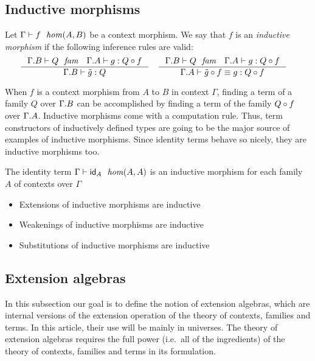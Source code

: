 \subsection{Inductive morphisms}
\begin{defn}
Let $\jhom{\Gamma}{A}{B}{f}$ be a context morphism. We say that $f$ is an 
\emph{inductive morphism} if the following inference rules are valid:
\begin{align*}
& \inference
  { \jfam{{\Gamma}{B}}{Q}
    \jterm{{\Gamma}{A}}{\jcomp{A}{f}{Q}}{g}
    }
  { \jterm{{\Gamma}{B}}{Q}{\jtcext{g}}
    }
& & \inference
  { \jfam{{\Gamma}{B}}{Q}
    \jterm{{\Gamma}{A}}{\jcomp{A}{f}{Q}}{g}
    }
  { \jtermeq{{\Gamma}{A}}{\jcomp{A}{f}{Q}}{\jcomp{A}{f}{\jtcext{g}}}{g}
    }
\end{align*}
\end{defn}

When $f$ is a context morphism from $A$ to $B$ in context $\Gamma$, 
finding a term of a family $Q$ over $\ctxext{\Gamma}{B}$ can be accomplished
by finding a term of the family $\jcomp{A}{f}{Q}$ over $\ctxext{\Gamma}{A}$.
Inductive morphisms come with a computation rule. Thus, term
constructors of inductively defined types are going to be the major source of
examples of inductive morphisms. Since identity terms behave
so nicely, they are inductive morphisms too.

\begin{lem}
The identity term
$\jhom{\Gamma}{A}{A}{\idtm{A}}$ is an inductive morphism
for each family $A$ of contexts over $\Gamma$
\end{lem}

\begin{itemize}
\item Extensions of inductive morphisms are inductive
\item Weakenings of inductive morphisms are inductive
\item Substitutions of inductive morphisms are inductive
\end{itemize}

\subsection{Extension algebras}
In this subsection our goal is to define the notion of extension algebras,
which are internal versions of the extension operation of the theory of
contexts, families and terms. In this article, their use will be mainly in
universes. The theory of extension algebras requires the full power (i.e.~all
of the ingredients) of the theory of contexts, families and terms in its
formulation.

